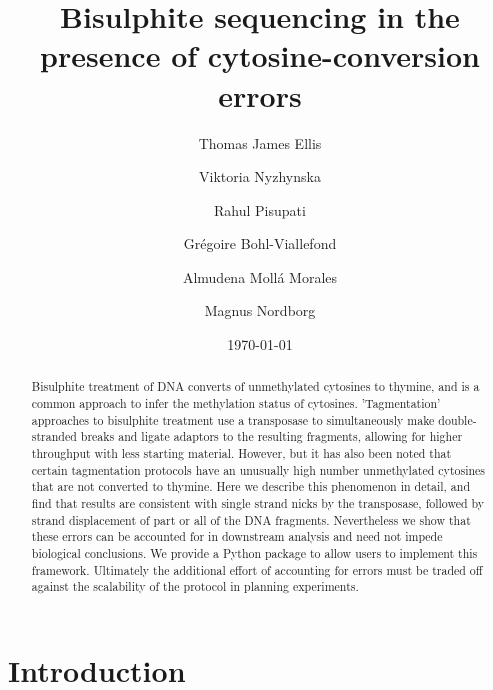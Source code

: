 \documentclass[12pt,longbibliography]{article}
\title{Bisulphite sequencing in the presence of cytosine-conversion errors} %
\author{
    Thomas James Ellis 
    \and
    Viktoria Nyzhynska
    \and
    Rahul Pisupati 
    \and
    Gr\'{e}goire Bohl-Viallefond
    \and
    Almudena Moll\'a Morales
    \and
    Magnus Nordborg
}
\date{\today} %
\begin{document}
\maketitle

\begin{abstract}
    Bisulphite treatment of DNA converts of unmethylated cytosines to thymine, and is a common approach to infer the methylation status of cytosines.
    'Tagmentation' approaches to bisulphite treatment use a transposase to simultaneously make double-stranded breaks and ligate adaptors to the resulting fragments, allowing for higher throughput with less starting material.
    However, but it has also been noted that certain tagmentation protocols have an unusually high number unmethylated cytosines that are not converted to thymine.
    Here we describe this phenomenon in detail, and find that results are consistent with single strand nicks by the transposase, followed by strand displacement of part or all of the DNA fragments.
    Nevertheless we show that these errors can be accounted for in downstream analysis and need not impede biological conclusions.
    We provide a Python package to allow users to implement this framework.
    Ultimately the additional effort of accounting for errors must be traded off against the scalability of the protocol in planning experiments.
    \end{abstract}






\maketitle


\section{Introduction}
\end{document}
